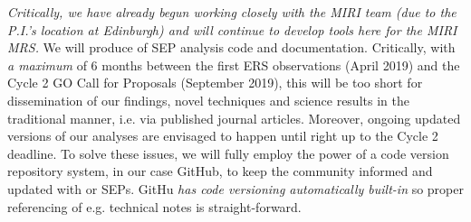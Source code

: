 
\noindent
{\it Critically, we have already begun working closely with the MIRI
team (due to the P.I.'s location at Edinburgh) and will continue to
develop tools here for the MIRI MRS.}
We will produce of SEP analysis code and documentation.  Critically,
with {\it a maximum} of 6 months between the first ERS observations
(April 2019) and the Cycle 2 GO Call for Proposals (September 2019),
this will be too short for dissemination of our findings, novel
techniques and science results in the traditional manner, i.e. via
published journal articles. Moreover, ongoing updated versions of our
analyses are envisaged to happen until right up to the Cycle 2
deadline.  To solve these issues, we will fully employ the power of a
code version repository system, in our case GitHub, to keep the
community informed and updated with or SEPs. GitHu {\it has code
versioning automatically built-in} so proper referencing of
e.g. technical notes is straight-forward.






